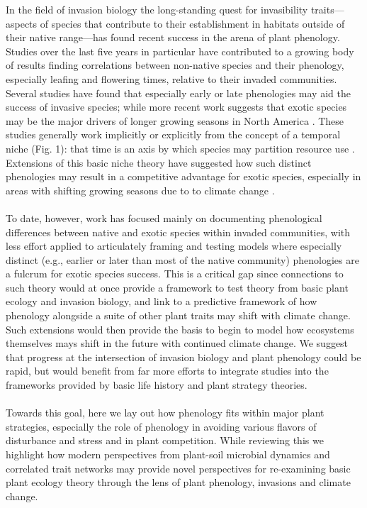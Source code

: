 \documentclass[11pt,a4paper,oneside]{article}
\begin{document}
\newpage
\linenumbers
In the field of invasion biology the long-standing quest for invasibility traits---aspects of species that contribute to their establishment in habitats outside of their native range---has found recent success in the arena of plant phenology. Studies over the last five years in particular have contributed to a growing body of results finding correlations between non-native species and their phenology, especially leafing and flowering times, relative to their invaded communities. Several studies have found that especially early \citep{mcewan2009,Wilsey:2011cr,throop2012,Wainwright:2012tw} or late \citep{Godoy:2009dz,Fridley:2012fj,paquette2012,Pearson:2012uq} phenologies may aid the success of invasive species; while more recent work suggests that exotic species may be the major drivers of longer growing seasons in North America \citep{wolkovichAmBot2013}. These studies generally work implicitly or explicitly from the concept of a temporal niche (Fig. 1): that time is an axis by which species may partition resource use \citep{gotelli1996}. Extensions of this basic niche theory have suggested how such distinct phenologies may result in a competitive advantage for exotic species, especially in areas with shifting growing seasons due to to climate change \citep{wolkovich:2010fee}.\\ 
\\
To date, however, work has focused mainly on documenting phenological differences between native and exotic species within invaded communities, with less effort applied to articulately framing and testing models where especially distinct (e.g., earlier or later than most of the native community) phenologies are a fulcrum for exotic species success. This is a critical gap since connections to such theory would at once provide a framework to test theory from basic plant ecology and invasion biology, and link to a predictive framework of how phenology alongside a suite of other plant traits may shift with climate change. Such extensions would then provide the basis to begin to model how ecosystems themselves mays shift in the future with continued climate change. We suggest that progress at the intersection of invasion biology and plant phenology could be rapid, but would benefit from far more efforts to integrate studies into the frameworks provided by basic life history and plant strategy theories.\\
\\
Towards this goal, here we lay out how phenology fits within major plant strategies, especially the role of phenology in avoiding various flavors of disturbance and stress and in plant competition. While reviewing this we highlight how modern perspectives from plant-soil microbial dynamics and correlated trait networks may provide novel perspectives for re-examining basic plant ecology theory through the lens of plant phenology, invasions and climate change. \\
\end{document}
